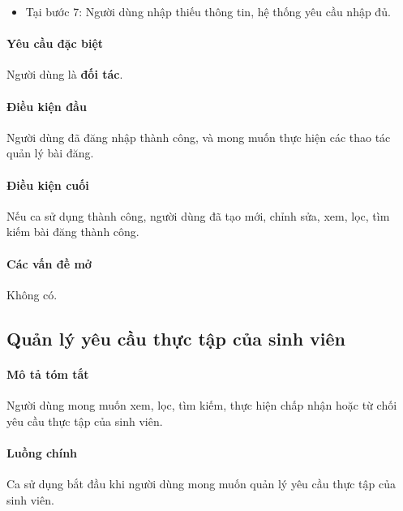 \documentclass[./../main.tex]{subfiles}
\begin{document}
\begin{itemize}
  \item
    
  Tại bước 7: Người dùng nhập thiếu thông tin, hệ thống yêu cầu nhập đủ.

\end{itemize}

\paragraph*{Yêu cầu đặc biệt}

Người dùng là \textbf{đối tác}.

\paragraph*{Điều kiện đầu}

Người dùng đã đăng nhập thành công, và mong muốn thực hiện các thao tác quản lý bài đăng.

\paragraph*{Điều kiện cuối}

Nếu ca sử dụng thành công, người dùng đã tạo mới, chỉnh sửa, xem, lọc, tìm kiếm bài đăng thành công.

\paragraph*{Các vấn đề mở}

Không có.

\subsection{Quản lý yêu cầu thực tập của sinh viên}

\paragraph*{Mô tả tóm tắt}

Người dùng mong muốn xem, lọc, tìm kiếm, thực hiện chấp nhận hoặc từ chối yêu cầu thực tập của sinh viên.

\paragraph*{Luồng chính} Ca sử dụng bắt đầu khi người dùng mong muốn quản lý yêu cầu thực tập của sinh viên.
\end{document}
